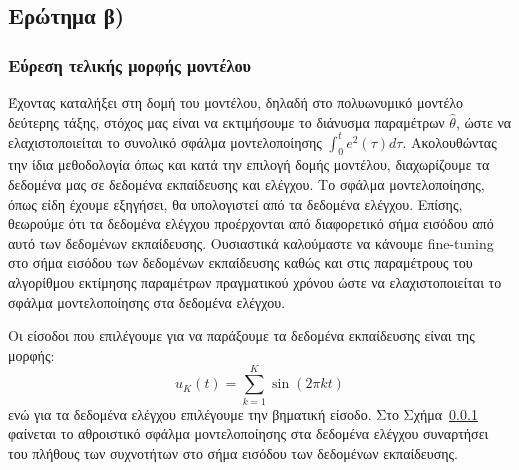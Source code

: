 \documentclass[a4paper,12pt]{article}
\begin{document}
\subsection*{Ερώτημα β)}
\subsubsection{Εύρεση τελικής μορφής μοντέλου}
Έχοντας καταλήξει στη δομή του μοντέλου, δηλαδή στο πολυωνυμικό μοντέλο δεύτερης τάξης, στόχος μας είναι
να εκτιμήσουμε το διάνυσμα παραμέτρων $\hat{\theta}$, ώστε να ελαχιστοποιείται το συνολικό σφάλμα 
μοντελοποίησης $\int_0^t e^2(\tau)d\tau$. Ακολουθώντας την ίδια μεθοδολογία όπως και κατά την επιλογή δομής
μοντέλου, διαχωρίζουμε τα δεδομένα μας σε δεδομένα εκπαίδευσης και ελέγχου. Το σφάλμα μοντελοποίησης, όπως
είδη έχουμε εξηγήσει, θα υπολογιστεί από τα δεδομένα ελέγχου. Επίσης, θεωρούμε ότι τα δεδομένα ελέγχου
προέρχονται από διαφορετικό σήμα εισόδου από αυτό των δεδομένων εκπαίδευσης. Ουσιαστικά καλούμαστε να
κάνουμε fine-tuning στο σήμα εισόδου των δεδομένων εκπαίδευσης
καθώς και στις παραμέτρους του αλγορίθμου εκτίμησης παραμέτρων πραγματικού χρόνου ώστε να ελαχιστοποιείται
το σφάλμα μοντελοποίησης στα δεδομένα ελέγχου.

Οι είσοδοι που επιλέγουμε για να παράξουμε τα δεδομένα εκπαίδευσης είναι της μορφής:
\[
    u_K(t) = \sum_{k=1}^K \sin(2 \pi kt)
\]
ενώ για τα δεδομένα ελέγχου επιλέγουμε την βηματική είσοδο. Στο Σχήμα~\ref{} φαίνεται το αθροιστικό σφάλμα
μοντελοποίησης στα δεδομένα ελέγχου συναρτήσει του πλήθους των συχνοτήτων στο σήμα εισόδου των δεδομένων 
εκπαίδευσης.
\end{document}
